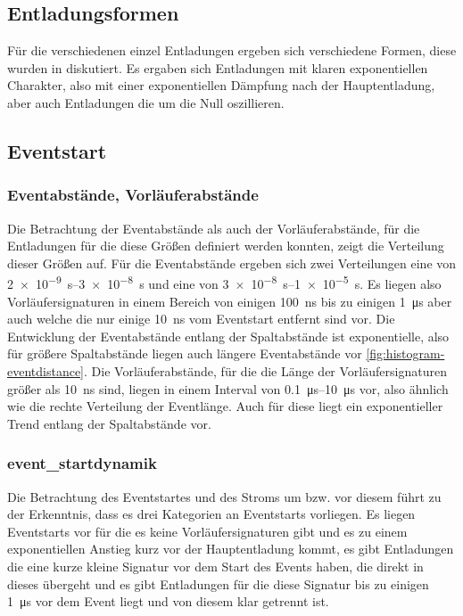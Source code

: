 \subsection{Entladungsformen}
Für die verschiedenen einzel Entladungen ergeben sich verschiedene Formen, diese wurden in  diskutiert. Es ergaben sich Entladungen mit klaren exponentiellen Charakter, also mit einer exponentiellen Dämpfung nach der Hauptentladung, aber auch Entladungen die um die Null oszillieren. 


\subsection{Eventstart}

\subsubsection{Eventabstände, Vorläuferabstände}
Die Betrachtung der Eventabstände als auch der Vorläuferabstände, für die Entladungen für die diese Größen definiert werden konnten, zeigt die Verteilung dieser Größen auf. Für die Eventabstände ergeben sich zwei Verteilungen eine von \SIrange{2e-9}{3e-8}{\second} und eine von \SIrange{3e-8}{1e-5}{\second}. Es liegen also Vorläufersignaturen in einem Bereich von einigen \SI{100}{\nano\second} bis zu einigen \SI{1}{\micro\second} aber auch welche die nur einige \SI{10}{\nano\second} vom Eventstart entfernt sind vor. Die Entwicklung der Eventabstände entlang der Spaltabstände ist exponentielle, also für größere Spaltabstände liegen auch längere Eventabstände vor \ref{fig:histogram-eventdistance}. Die Vorläuferabstände, für die die Länge der Vorläufersignaturen größer als \SI{10}{\nano\second} sind, liegen in einem Interval von \SIrange{0,1}{10}{\micro\second} vor, also ähnlich wie die rechte Verteilung der Eventlänge. Auch für diese liegt ein exponentieller Trend entlang der Spaltabstände vor. 

\subsubsection{event_startdynamik}
Die Betrachtung des Eventstartes und des Stroms um bzw. vor diesem führt zu der Erkenntnis, dass es drei Kategorien an Eventstarts vorliegen. Es liegen Eventstarts vor für die es keine Vorläufersignaturen gibt und es zu einem exponentiellen Anstieg kurz vor der Hauptentladung kommt, es gibt Entladungen die eine kurze kleine Signatur vor dem Start des Events haben, die direkt in dieses übergeht und es gibt Entladungen für die diese Signatur bis zu einigen \SI{1}{\micro\second} vor dem Event liegt und von diesem klar getrennt ist. 

